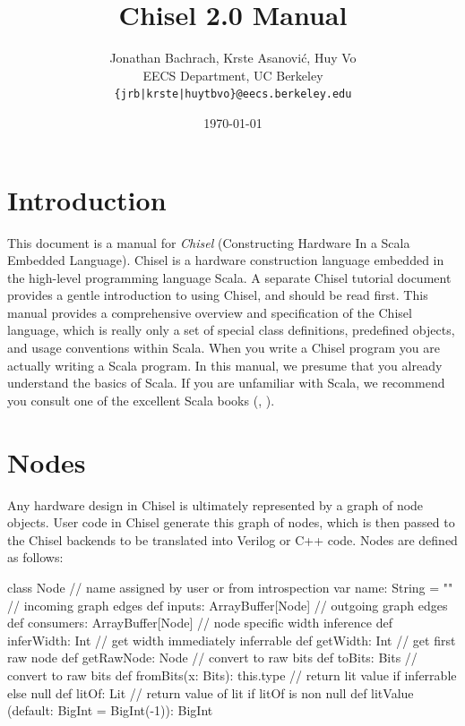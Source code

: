 \documentclass[10pt,twocolumn]{article}
\title{Chisel 2.0 Manual}
\author{Jonathan Bachrach, Krste Asanovi\'{c}, Huy Vo \\
EECS Department, UC Berkeley\\
{\tt  \{jrb|krste|huytbvo\}@eecs.berkeley.edu}
}
\date{\today}
\begin{document}
\maketitle{}




\section{Introduction}

This document is a manual for {\em Chisel} (Constructing Hardware In a
Scala Embedded Language).  Chisel is a hardware construction language
embedded in the high-level programming language Scala.  A separate
Chisel tutorial document provides a gentle introduction to using
Chisel, and should be read first.  This manual provides a
comprehensive overview and specification of the Chisel language, which
is really only a set of special class definitions, predefined objects,
and usage conventions within Scala.  When you write a Chisel program
you are actually writing a Scala program.  In this manual, we presume
that you already understand the basics of Scala.  If you are
unfamiliar with Scala, we recommend you consult one of the excellent
Scala books (\cite{programming-scala}, \cite{programming-in-scala}).

\section{Nodes}

Any hardware design in Chisel is ultimately represented by a graph of
node objects.  User code in Chisel generate this graph of nodes, which
is then passed to the Chisel backends to be translated into Verilog or
C++ code.  Nodes are defined as follows:

\begin{scala}
class Node {
  // name assigned by user or from introspection
  var name: String = ""
  // incoming graph edges
  def inputs: ArrayBuffer[Node]
  // outgoing graph edges
  def consumers: ArrayBuffer[Node]
  // node specific width inference
  def inferWidth: Int
  // get width immediately inferrable
  def getWidth: Int
  // get first raw node
  def getRawNode: Node
  // convert to raw bits 
  def toBits: Bits
  // convert to raw bits 
  def fromBits(x: Bits): this.type
  // return lit value if inferrable else null
  def litOf: Lit
  // return value of lit if litOf is non null
  def litValue
    (default: BigInt = BigInt(-1)): BigInt
}
\end{scala}
\end{document}
